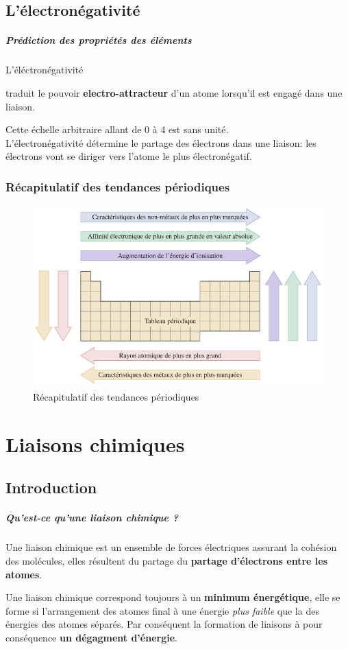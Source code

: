 \documentclass[10pt,a4paper]{book}
\begin{document}
\section{L'électronégativité}
\paragraph{Prédiction des propriétés des éléments} \hypertarget{electronegativity}{L'éléctronégativité} traduit le pouvoir \textbf{electro-attracteur} d'un atome lorsqu'il est engagé dans une liaison. \par 
Cette échelle arbitraire allant de 0 à 4 est sans unité. \\
L'électronégativité détermine le partage des électrons dans une liaison: les électrons vont se diriger vers l'atome le plus électronégatif.
\subsection{Récapitulatif des tendances périodiques}
\begin{figure}[h!]
\begin{center}
\includegraphics[scale=0.75]{./assets/recap_tendencies.png}
\end{center}
\caption{Récapitulatif des tendances périodiques}
\label{fig:recap}
\end{figure}
\chapter{Liaisons chimiques}
\section{Introduction}
\paragraph{Qu'est-ce qu'une liaison chimique ?} Une liaison chimique est un ensemble de forces électriques assurant la cohésion des molécules, elles résultent du partage du \textbf{partage d'électrons entre les atomes}. \par
Une liaison chimique correspond toujours à un \textbf{minimum énergétique}, elle se forme si l'arrangement des atomes final à une énergie \textit{plus faible} que la des énergies des atomes séparés. Par conséquent la formation de liaisons à pour conséquence \textbf{un dégagment d'énergie}.
\end{document}
